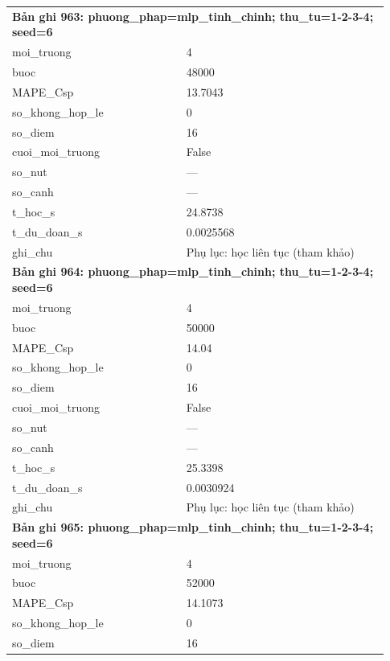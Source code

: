\begin{longtable}{p{0.43\linewidth}p{0.50\linewidth}}
\midrule
\multicolumn{2}{p{0.95\linewidth}}{\textbf{Bản ghi 963: phuong\_phap=mlp\_tinh\_chinh; thu\_tu=1-2-3-4; seed=6}} \\
moi\_\allowbreak truong & 4 \\
buoc & 48000 \\
MAPE\_\allowbreak Csp & 13.7043 \\
so\_\allowbreak khong\_\allowbreak hop\_\allowbreak le & 0 \\
so\_\allowbreak diem & 16 \\
cuoi\_\allowbreak moi\_\allowbreak truong & False \\
so\_\allowbreak nut & — \\
so\_\allowbreak canh & — \\
t\_\allowbreak hoc\_\allowbreak s & 24.8738 \\
t\_\allowbreak du\_\allowbreak doan\_\allowbreak s & 0.0025568 \\
ghi\_\allowbreak chu & Phụ lục: học liên tục (tham khảo) \\
\midrule
\multicolumn{2}{p{0.95\linewidth}}{\textbf{Bản ghi 964: phuong\_phap=mlp\_tinh\_chinh; thu\_tu=1-2-3-4; seed=6}} \\
moi\_\allowbreak truong & 4 \\
buoc & 50000 \\
MAPE\_\allowbreak Csp & 14.04 \\
so\_\allowbreak khong\_\allowbreak hop\_\allowbreak le & 0 \\
so\_\allowbreak diem & 16 \\
cuoi\_\allowbreak moi\_\allowbreak truong & False \\
so\_\allowbreak nut & — \\
so\_\allowbreak canh & — \\
t\_\allowbreak hoc\_\allowbreak s & 25.3398 \\
t\_\allowbreak du\_\allowbreak doan\_\allowbreak s & 0.0030924 \\
ghi\_\allowbreak chu & Phụ lục: học liên tục (tham khảo) \\
\midrule
\multicolumn{2}{p{0.95\linewidth}}{\textbf{Bản ghi 965: phuong\_phap=mlp\_tinh\_chinh; thu\_tu=1-2-3-4; seed=6}} \\
moi\_\allowbreak truong & 4 \\
buoc & 52000 \\
MAPE\_\allowbreak Csp & 14.1073 \\
so\_\allowbreak khong\_\allowbreak hop\_\allowbreak le & 0 \\
so\_\allowbreak diem & 16 \\

\end{longtable}
